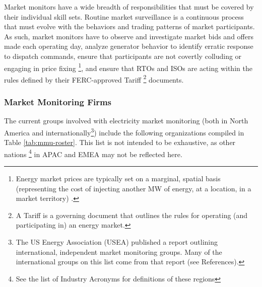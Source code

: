 Market monitors have a wide breadth of responsibilities that must be covered by their individual skill sets. Routine market surveillance is a continuous process that must evolve with the behaviors and trading patterns of market participants. As such, market monitors have to observe and investigate market bids and offers made each operating day, analyze generator behavior to identify erratic response to dispatch commands, ensure that participants are not covertly colluding or engaging in price fixing \footnote{Energy market prices are typically set on a marginal, spatial basis (representing the cost of injecting another MW of energy, at a location, in a market territory) \cite{lmpfaq}.}, and ensure that RTOs and ISOs are acting within the rules defined by their FERC-approved Tariff
\footnote{A Tariff is a governing document that outlines the rules for operating (and participating in) an energy market.} documents. 

\subsubsection{Market Monitoring Firms}

The current groups involved with electricity market monitoring (both in North America and internationally\footnote{The US Energy Association (USEA) published a report outlining international, independent market monitoring groups. Many of the international groups on this list come from that report (see References).}) include the following organizations compiled in Table \ref{tab:mmu-roster}. This list is not intended to be exhaustive, as other nations \footnote{See the list of Industry Acronyms for definitions of these regions} in APAC and EMEA may not be reflected here.

